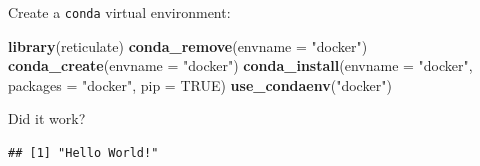 \documentclass[]{book}
\newenvironment{Shaded}{\begin{snugshade}}{\end{snugshade}}
\newcommand{\DataTypeTok}[1]{\textcolor[rgb]{0.13,0.29,0.53}{#1}}
\newcommand{\KeywordTok}[1]{\textcolor[rgb]{0.13,0.29,0.53}{\textbf{#1}}}
\newcommand{\NormalTok}[1]{#1}
\newcommand{\OperatorTok}[1]{\textcolor[rgb]{0.81,0.36,0.00}{\textbf{#1}}}
\newcommand{\OtherTok}[1]{\textcolor[rgb]{0.56,0.35,0.01}{#1}}
\newcommand{\StringTok}[1]{\textcolor[rgb]{0.31,0.60,0.02}{#1}}
\theoremstyle{definition}
\theoremstyle{definition}
\theoremstyle{definition}
\theoremstyle{remark}
\begin{document}
Create a \texttt{conda} virtual environment:

\begin{Shaded}
\begin{Highlighting}[]
\KeywordTok{library}\NormalTok{(reticulate)}
\KeywordTok{conda_remove}\NormalTok{(}\DataTypeTok{envname =} \StringTok{"docker"}\NormalTok{)}
\KeywordTok{conda_create}\NormalTok{(}\DataTypeTok{envname =} \StringTok{"docker"}\NormalTok{)}
\KeywordTok{conda_install}\NormalTok{(}\DataTypeTok{envname =} \StringTok{"docker"}\NormalTok{, }\DataTypeTok{packages =} \StringTok{"docker"}\NormalTok{, }\DataTypeTok{pip =} \OtherTok{TRUE}\NormalTok{)}
\KeywordTok{use_condaenv}\NormalTok{(}\StringTok{"docker"}\NormalTok{)}
\end{Highlighting}
\end{Shaded}

Did it work?

\begin{Shaded}
\end{Shaded}

\begin{verbatim}
## [1] "Hello World!"
\end{verbatim}


\end{document}

